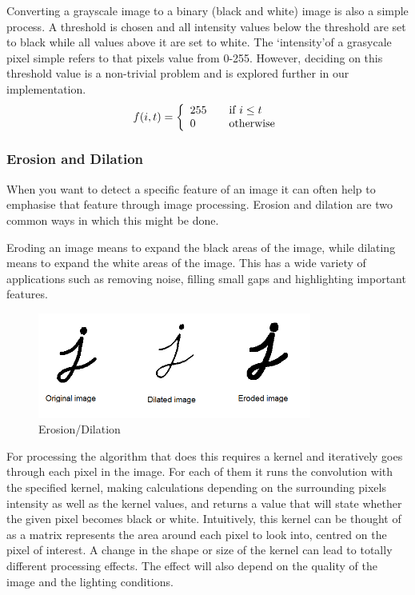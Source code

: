 Converting a grayscale image to a binary (black and white) image is also a simple process. A threshold is chosen and all intensity values below the threshold are set to black while all values above it are set to white. The \lq intensity\rq of a grasycale pixel simple refers to that pixels value from 0-255. However, deciding on this threshold value is a non-trivial problem and is explored further in our implementation.   
\[ f(i,t) = \left\{ 
  \begin{array}{l l}
    255 & \quad \text{if } i \leq  t\\
    0   & \quad \text{otherwise}
  \end{array} \right.\]

        \subsubsection{Erosion and Dilation} \label{sec:erosion}

When you want to detect a specific feature of an image it can often help to emphasise that feature through image processing. Erosion and dilation are two common ways in which this might be done.

Eroding an image means to expand the black areas of the image, while dilating means to expand the white areas of the image. This has a wide variety of applications such as removing noise, filling small gaps and highlighting important features.
            \begin{figure}[ht!]
                \centering
                \includegraphics[width=90mm]{./assets/dilated.png}
                \caption{Erosion/Dilation}
                \label{image:dilationerosion}
            \end{figure}

For processing the algorithm that does this requires a kernel and iteratively goes through each pixel in the image. For each of them it runs the convolution with the specified kernel, making calculations depending on the surrounding pixels intensity as well as the kernel values, and returns a value that will state whether the given pixel becomes black or white. Intuitively, this kernel can be thought of as a matrix represents the area around each pixel to look into, centred on the pixel of interest. A change in the shape or size of the kernel can lead to totally different processing effects. The effect will also depend on the quality of the image and the lighting conditions.

